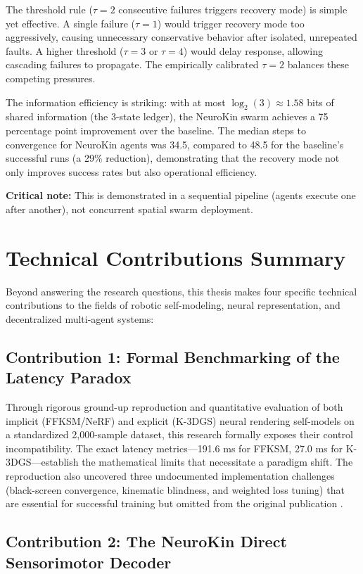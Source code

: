 \documentclass[12pt,a4paper,oneside]{report}
\begin{document}
The threshold rule ($\tau = 2$ consecutive failures triggers recovery mode) is simple yet effective. A single failure ($\tau = 1$) would trigger recovery mode too aggressively, causing unnecessary conservative behavior after isolated, unrepeated faults. A higher threshold ($\tau = 3$ or $\tau = 4$) would delay response, allowing cascading failures to propagate. The empirically calibrated $\tau = 2$ balances these competing pressures.

The information efficiency is striking: with at most $\log_2(3) \approx 1.58$ bits of shared information (the 3-state ledger), the NeuroKin swarm achieves a 75 percentage point improvement over the baseline. The median steps to convergence for NeuroKin agents was 34.5, compared to 48.5 for the baseline's successful runs (a 29\% reduction), demonstrating that the recovery mode not only improves success rates but also operational efficiency.

\textbf{Critical note:} This is demonstrated in a sequential pipeline (agents execute one after another), not concurrent spatial swarm deployment.

\section{Technical Contributions Summary}

Beyond answering the research questions, this thesis makes four specific technical contributions to the fields of robotic self-modeling, neural representation, and decentralized multi-agent systems:

\subsection{Contribution 1: Formal Benchmarking of the Latency Paradox}

Through rigorous ground-up reproduction and quantitative evaluation of both implicit (FFKSM/NeRF) and explicit (K-3DGS) neural rendering self-models on a standardized 2,000-sample dataset, this research formally exposes their control incompatibility. The exact latency metrics---191.6 ms for FFKSM, 27.0 ms for K-3DGS---establish the mathematical limits that necessitate a paradigm shift. The reproduction also uncovered three undocumented implementation challenges (black-screen convergence, kinematic blindness, and weighted loss tuning) that are essential for successful training but omitted from the original publication \cite{hu2024teaching}.

\subsection{Contribution 2: The NeuroKin Direct Sensorimotor Decoder}
\end{document}
